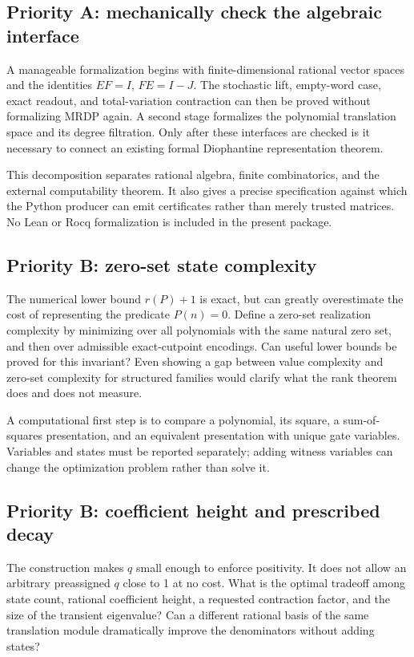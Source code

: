\documentclass[11pt,letterpaper]{article}
\theoremstyle{definition}
\theoremstyle{remark}
\begin{document}
\subsection{Priority A: mechanically check the algebraic interface}\label{ste:mx:q:formal}

A manageable formalization begins with finite-dimensional rational vector
spaces and the identities $EF=I$, $FE=I-J$. The stochastic lift, empty-word
case, exact readout, and total-variation contraction can then be proved without
formalizing MRDP again. A second stage formalizes the polynomial translation
space and its degree filtration. Only after these interfaces are checked is
it necessary to connect an existing formal Diophantine representation theorem.

This decomposition separates rational algebra, finite combinatorics, and the
external computability theorem. It also gives a precise specification against
which the Python producer can emit certificates rather than merely trusted
matrices. No Lean or Rocq formalization is included in the present package.

\subsection{Priority B: zero-set state complexity}\label{ste:mx:q:zeroset}

The numerical lower bound $r(P)+1$ is exact, but can greatly overestimate the
cost of representing the predicate $P(n)=0$. Define a zero-set realization
complexity by minimizing over all polynomials with the same natural zero set,
and then over admissible exact-cutpoint encodings. Can useful lower bounds be
proved for this invariant? Even showing a gap between value complexity and
zero-set complexity for structured families would clarify what the rank theorem
does and does not measure.

A computational first step is to compare a polynomial, its square, a
sum-of-squares presentation, and an equivalent presentation with unique gate
variables. Variables and states must be reported separately; adding witness
variables can change the optimization problem rather than solve it.

\subsection{Priority B: coefficient height and prescribed decay}\label{ste:mx:q:height}

The construction makes $q$ small enough to enforce positivity. It does not
allow an arbitrary preassigned $q$ close to 1 at no cost. What is the optimal
tradeoff among state count, rational coefficient height, a requested contraction
factor, and the size of the transient eigenvalue? Can a different rational basis
of the same translation module dramatically improve the denominators without
adding states?
\end{document}
